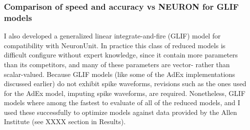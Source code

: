 




\subsubsection{Comparison of speed and accuracy vs NEURON for GLIF models}
I also developed a generalized linear integrate-and-fire (GLIF) model for compatibility with NeuronUnit.
In practice this class of reduced models is difficult configure without expert knowledge, since it contain more parameters than its competitors, and many of these parameters are vector- rather than scalar-valued.
Because GLIF models (like some of the AdEx implementations discussed earlier) do not exhibit spike waveforms, revisions such as the ones used for the AdEx model, imputing spike waveforms, are required.
Nonetheless, GLIF models where among the fastest to evaluate of all of the reduced models, and I used these successfully to optimize models against data provided by the Allen Institute (see XXXX section in Results).

    


